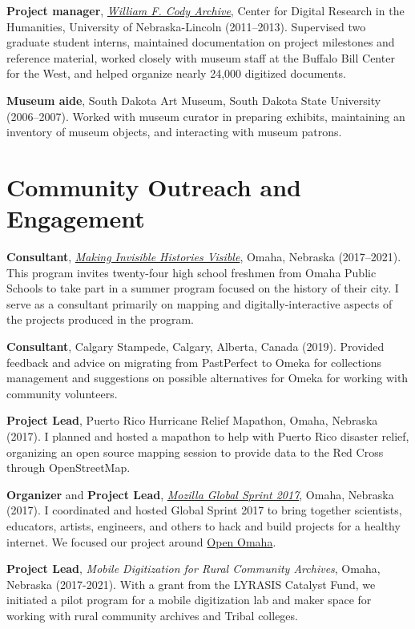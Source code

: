 \textbf{Project manager}, \emph{\href{http://codyarchive.org}{William F.
Cody Archive}}, Center for Digital Research in the Humanities,
University of Nebraska-Lincoln (2011--2013). Supervised two graduate
student interns, maintained documentation on project milestones and
reference material, worked closely with museum staff at the Buffalo Bill
Center for the West, and helped organize nearly 24,000 digitized
documents.

\textbf{Museum aide}, South Dakota Art Museum, South Dakota State
University (2006--2007). Worked with museum curator in preparing
exhibits, maintaining an inventory of museum objects, and interacting
with museum patrons.

\section{Community Outreach and
Engagement}\label{community-outreach-and-engagement}

\textbf{Consultant}, \emph{\href{http://invisiblehistory.ops.org}{Making
Invisible Histories Visible}}, Omaha, Nebraska (2017--2021). This
program invites twenty-four high school freshmen from Omaha Public
Schools to take part in a summer program focused on the history of their
city. I serve as a consultant primarily on mapping and
digitally-interactive aspects of the projects produced in the program.

\textbf{Consultant}, Calgary Stampede, Calgary, Alberta, Canada (2019).
Provided feedback and advice on migrating from PastPerfect to Omeka for
collections management and suggestions on possible alternatives for
Omeka for working with community volunteers.

\textbf{Project Lead}, Puerto Rico Hurricane Relief Mapathon, Omaha,
Nebraska (2017). I planned and hosted a mapathon to help with Puerto
Rico disaster relief, organizing an open source mapping session to
provide data to the Red Cross through OpenStreetMap.

\textbf{Organizer} and \textbf{Project Lead},
\emph{\href{https://mozilla.github.io/global-sprint/}{Mozilla Global
Sprint 2017}}, Omaha, Nebraska (2017). I coordinated and hosted Global
Sprint 2017 to bring together scientists, educators, artists, engineers,
and others to hack and build projects for a healthy internet. We focused
our project around \href{http://github.com/open-omaha/}{Open Omaha}.

\textbf{Project Lead}, \emph{Mobile Digitization for Rural Community
Archives}, Omaha, Nebraska (2017-2021). With a grant from the LYRASIS
Catalyst Fund, we initiated a pilot program for a mobile digitization
lab and maker space for working with rural community archives and Tribal
colleges.

